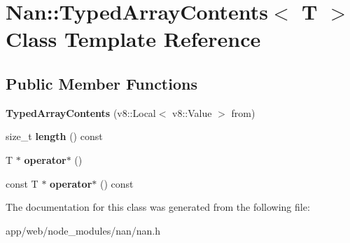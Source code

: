 \hypertarget{class_nan_1_1_typed_array_contents}{}\section{Nan\+:\+:Typed\+Array\+Contents$<$ T $>$ Class Template Reference}
\label{class_nan_1_1_typed_array_contents}
\subsection*{Public Member Functions}
\begin{DoxyCompactItemize}
\item 
\mbox{\label{class_nan_1_1_typed_array_contents_a503b12dcd51930d91e389b33e2beac3f}} 
{\bfseries Typed\+Array\+Contents} (v8\+::\+Local$<$ v8\+::\+Value $>$ from)
\item 
\mbox{\label{class_nan_1_1_typed_array_contents_aee8f60d8bd23d45c895a8a9119d91011}} 
size\+\_\+t {\bfseries length} () const
\item 
\mbox{\label{class_nan_1_1_typed_array_contents_a37eb8b81e9b6b567223c9a35b5ec3484}} 
T $\ast$ {\bfseries operator$\ast$} ()
\item 
\mbox{\label{class_nan_1_1_typed_array_contents_acc73ef13680306577f0126be75e91e43}} 
const T $\ast$ {\bfseries operator$\ast$} () const
\end{DoxyCompactItemize}


The documentation for this class was generated from the following file\+:\begin{DoxyCompactItemize}
\item 
app/web/node\+\_\+modules/nan/nan.\+h\end{DoxyCompactItemize}
